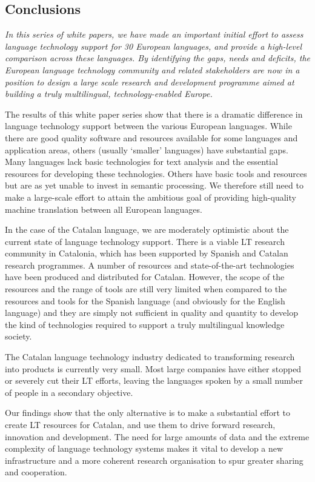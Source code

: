 \begin{multicols}{2}
\subsection{Conclusions}

    \emph{In this series of white papers, we have made an important initial effort to assess language technology support for 30 European languages, and provide a high-level comparison across these languages. By identifying the gaps, needs and deficits, the European language technology community and related stakeholders are now in a position to design a large scale research and development programme aimed at building a truly multilingual, technology-enabled Europe.}

The results of this white paper series show that there is a dramatic difference in language technology support between the various European languages. While there are good quality software and resources available for some languages and application areas, others (usually ‘smaller’ languages) have substantial gaps. Many languages lack basic technologies for text analysis and the essential resources for developing these technologies. Others have basic tools and resources but are as yet unable to invest in semantic processing. We therefore still need to make a large-scale effort to attain the ambitious goal of providing high-quality machine translation between all European languages. 

    In the case of the Catalan language, we are moderately optimistic about the current state of language technology support. There is a viable LT research community in Catalonia, which has been supported by Spanish and Catalan research programmes. A number of resources and state-of-the-art technologies have been produced and distributed for Catalan. However, the scope of the resources and the range of tools are still very limited when compared to the resources and tools for the Spanish language (and obviously for the English language) and they are simply not sufficient in quality and quantity to develop the kind of technologies required to support a truly multilingual knowledge society.

    The Catalan language technology industry dedicated to transforming research into products is currently very small. Most large companies have either stopped or severely cut their LT efforts, leaving the languages spoken by a small number of people in a secondary objective.

    Our findings show that the only alternative is to make a substantial effort to create LT resources for Catalan, and use them to drive forward research, innovation and development. The need for large amounts of data and the extreme complexity of language technology systems makes it vital to develop a new infrastructure and a more coherent research organisation to spur greater sharing and cooperation.


\end{multicols}
